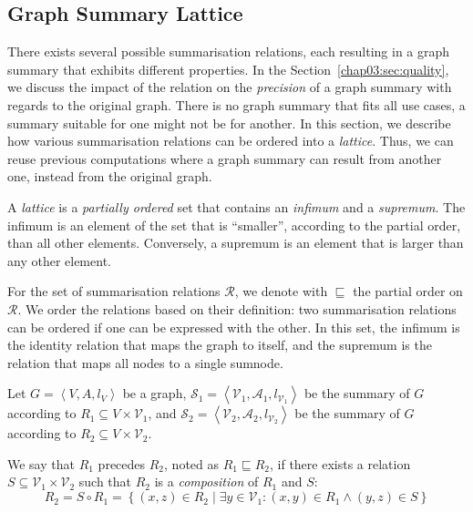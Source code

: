 \subsection{Graph Summary Lattice}

There exists several possible summarisation relations, each resulting in a graph summary that exhibits different properties. In the Section~\ref{chap03:sec:quality}, we discuss the impact of the relation on the \emph{precision} of a graph summary with regards to the original graph. There is no graph summary that fits all use cases, a summary suitable for one might not be for another. In this section, we describe how various summarisation relations can be ordered into a \emph{lattice}. Thus, we can reuse previous computations where a graph summary can result from another one, instead from the original graph.

A \emph{lattice} is a \emph{partially ordered} set that contains an \emph{infimum} and a \emph{supremum}. The infimum is an element of the set that is ``smaller'', according to the partial order, than all other elements. Conversely, a supremum is an element that is larger than any other element.

For the set of summarisation relations $\mathcal{R}$, we denote with $\sqsubseteq$ the partial order on $\mathcal{R}$. We order the relations based on their definition: two summarisation relations can be ordered if one can be expressed with the other. In this set, the infimum is the identity relation that maps the graph to itself, and the supremum is the relation that maps all nodes to a single sumnode.

\begin{definition}
Let $G=\left\langle V, A, l_V \right\rangle$ be a graph, $\mathcal{S}_1 = \left\langle \mathcal{V}_1, \mathcal{A}_1, l_{\mathcal{V}_1} \right\rangle$ be the summary of $G$ according to $R_1 \subseteq V \times \mathcal{V}_1$, and $\mathcal{S}_2 = \left\langle \mathcal{V}_2, \mathcal{A}_2, l_{\mathcal{V}_2} \right\rangle$ be the summary of $G$ according to $R_2 \subseteq V \times \mathcal{V}_2$.

We say that $R_1$ precedes $R_2$, noted as $R_1 \sqsubseteq R_2$, if there exists a relation $S \subseteq \mathcal{V}_1 \times \mathcal{V}_2$ such that $R_2$ is a \emph{composition} of $R_1$ and $S$:
$$
R_2 = S \circ R_1 = \left\lbrace (x, z) \in R_2 \mid \exists y \in \mathcal{V}_1 : (x, y) \in R_1 \wedge (y, z) \in S \right\rbrace 
$$
\end{definition}

